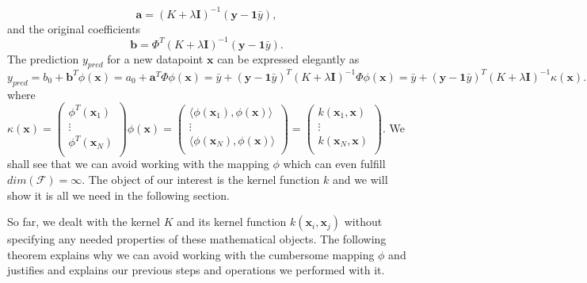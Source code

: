 \documentclass[11pt,oneside,czech,american]{book} %
\theoremstyle{plain}
\theoremstyle{definition}
\begin{document}
\begin{equation}
	\bm{a} = (K + \lambda \bm{I})^{-1} (\bm{y} - \bm{1}\bar{y}),
\end{equation}
and the original coefficients
\begin{equation}
	\bm{b} = \Phi^T (K + \lambda \bm{I})^{-1} (\bm{y} - \bm{1}\bar{y}).
\end{equation}
The prediction $y_{pred}$ for a new datapoint $\bm{x}$ can be expressed elegantly as
\begin{equation}
	y_{pred} = b_0 + \bm{b}^T \phi(\bm{x}) = a_0 + \bm{a}^T \Phi \phi(\bm{x}) = \bar{y} + (\bm{y} - \bm{1}\bar{y})^T (K + \lambda \bm{I})^{-1} \Phi \phi(\bm{x}) = \bar{y} + (\bm{y} - \bm{1}\bar{y})^T (K + \lambda \bm{I})^{-1} \kappa(\bm{x}).
\end{equation}
where $\kappa(\bm{x}) = \begin{pmatrix}
	\phi^T (\bm{x}_1) \\
	\vdots \\
	\phi^T (\bm{x}_N) \\
\end{pmatrix} \phi(\bm{x}) = \begin{pmatrix}
	\langle \phi (\bm{x}_1), \phi(\bm{x}) \rangle \\
	\vdots \\
	\langle \phi (\bm{x}_N), \phi(\bm{x}) \rangle \\
\end{pmatrix} = \begin{pmatrix}
	k(\bm{x}_1, \bm{x}) \\
	\vdots \\
	k(\bm{x}_N, \bm{x}) \\
\end{pmatrix}$. We shall see that we can avoid working with the mapping $\phi$ which can even fulfill $dim(\mathcal{F}) = \infty$. The object of our interest is the kernel function $k$ and we will show it is all we need in the following section.

So far, we dealt with the kernel $K$ and its kernel function $k(\bm{x}_i, \bm{x}_j)$ without specifying any needed properties of these mathematical objects. The following theorem explains why we can avoid working with the cumbersome mapping $\phi$ and justifies and explains our previous steps and operations we performed with it.
\end{document}
